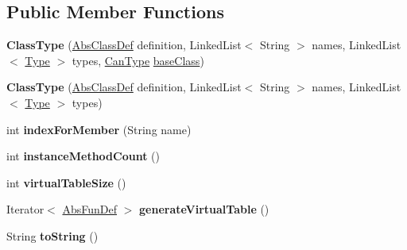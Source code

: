 \subsection*{Public Member Functions}
\begin{DoxyCompactItemize}
\item 
\mbox{\label{classcompiler_1_1seman_1_1type_1_1_class_type_a666c678e1557a95bd63464a9ecc327b7}} 
{\bfseries Class\+Type} (\hyperlink{classcompiler_1_1abstr_1_1tree_1_1def_1_1_abs_class_def}{Abs\+Class\+Def} definition, Linked\+List$<$ String $>$ names, Linked\+List$<$ \hyperlink{classcompiler_1_1seman_1_1type_1_1_type}{Type} $>$ types, \hyperlink{classcompiler_1_1seman_1_1type_1_1_can_type}{Can\+Type} \hyperlink{classcompiler_1_1seman_1_1type_1_1_object_type_a776328ea5119061ad683d36d7c8ff1ef}{base\+Class})
\item 
\mbox{\label{classcompiler_1_1seman_1_1type_1_1_class_type_ab17e687944ff00cf7cc89dbfc7143307}} 
{\bfseries Class\+Type} (\hyperlink{classcompiler_1_1abstr_1_1tree_1_1def_1_1_abs_class_def}{Abs\+Class\+Def} definition, Linked\+List$<$ String $>$ names, Linked\+List$<$ \hyperlink{classcompiler_1_1seman_1_1type_1_1_type}{Type} $>$ types)
\item 
\mbox{\label{classcompiler_1_1seman_1_1type_1_1_class_type_a0f5179881694077f141cd52a07109ff4}} 
int {\bfseries index\+For\+Member} (String name)
\item 
\mbox{\label{classcompiler_1_1seman_1_1type_1_1_class_type_ad45e7f60cf39bfa13e392c0f8b70a6c3}} 
int {\bfseries instance\+Method\+Count} ()
\item 
\mbox{\label{classcompiler_1_1seman_1_1type_1_1_class_type_a89a6b7204c990e105d1a9e039344bbff}} 
int {\bfseries virtual\+Table\+Size} ()
\item 
\mbox{\label{classcompiler_1_1seman_1_1type_1_1_class_type_a0f5e7ca61557ae4599286fb37219d38d}} 
Iterator$<$ \hyperlink{classcompiler_1_1abstr_1_1tree_1_1def_1_1_abs_fun_def}{Abs\+Fun\+Def} $>$ {\bfseries generate\+Virtual\+Table} ()
\item 
\mbox{\label{classcompiler_1_1seman_1_1type_1_1_class_type_a1a7da1e82e792d84b055aeaf60d8c54d}} 
String {\bfseries to\+String} ()
\end{DoxyCompactItemize}
